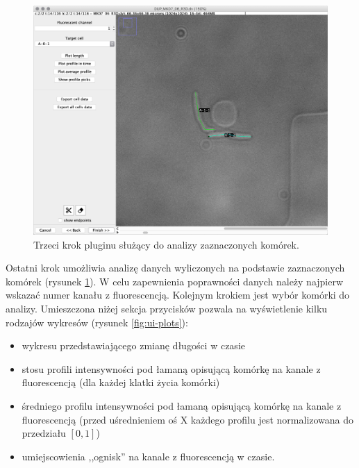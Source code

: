 \documentclass[declaration,shortabstract,mgr]{iithesis}
\begin{document}
\begin{figure}
  \centering
  \includegraphics[width=\textwidth]{images/ui-step-measurements.png}
  \caption{Trzeci krok pluginu służący do analizy zaznaczonych komórek.}
  \label{fig:ui-step-measurements}
\end{figure}

Ostatni krok umożliwia analizę danych wyliczonych na podstawie zaznaczonych komórek (rysunek \ref{fig:ui-step-measurements}).
W celu zapewnienia poprawności danych należy najpierw wskazać numer kanału z fluorescencją. Kolejnym krokiem jest wybór komórki do analizy.
Umieszczona niżej sekcja przycisków pozwala na wyświetlenie kilku rodzajów wykresów (rysunek \ref{fig:ui-plots}):

\begin{itemize}
  \item wykresu przedstawiającego zmianę długości w czasie
  \item stosu profili intensywności pod łamaną opisującą komórkę na kanale z fluorescencją (dla każdej klatki życia komórki)
  \item średniego profilu intensywności pod łamaną opisującą komórkę na kanale z fluorescencją (przed uśrednieniem oś X każdego profilu jest normalizowana do przedziału $[0, 1]$)
  \item umiejscowienia ,,ognisk'' na kanale z fluorescencją w czasie.
\end{itemize}
\end{document}
